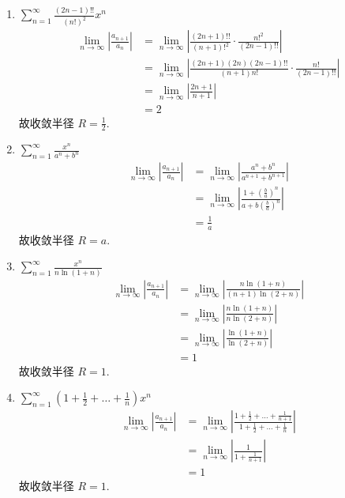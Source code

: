 \begin{solution}
    \begin{enumerate}
        \item \(\sum_{n=1}^{\infty} \frac{(2n-1)!!}{(n!)^2} x^n\)
            \begin{align*}
                \lim_{n \to \infty} \left| \frac{a_{n+1}}{a_n}
                \right| &= \lim_{n \to \infty} \left|
                \frac{(2n+1)!!}{(n+1)!^2} \cdot
                \frac{n!^2}{(2n-1)!!} \right| \\
                &= \lim_{n \to \infty} \left|
                \frac{(2n+1)(2n)(2n-1)!!}{(n+1)n!} \cdot
                \frac{n!}{(2n-1)!!} \right| \\
                &= \lim_{n \to \infty} \left|
                \frac{2n+1}{n+1} \right| \\
                &= 2
            \end{align*}
            故收敛半径 \(R = \frac{1}{2}\).
        \item \(\sum_{n=1}^{\infty} \frac{x^{n}}{a^{n} + b^{n}}\)
            \begin{align*}
                \lim_{n \to \infty} \left| \frac{a_{n+1}}{a_n}
                \right| &= \lim_{n \to \infty} \left| \frac{a^n +
                b^n}{a^{n+1} + b^{n+1}} \right| \\
                &= \lim_{n \to \infty} \left| \frac{1 +
                \left(\frac{b}{a}\right)^n}{a + b
                \left(\frac{b}{a}\right)^n} \right| \\
                &= \frac{1}{a}
            \end{align*}
            故收敛半径 \(R = a\).
        \item \(\sum_{n=1}^{\infty} \frac{x^n}{n \ln(1+n)}\)
            \begin{align*}
                \lim_{n \to \infty} \left| \frac{a_{n+1}}{a_n}
                \right| &= \lim_{n \to \infty} \left| \frac{n
                \ln(1+n)}{(n+1) \ln(2+n)} \right| \\
                &= \lim_{n \to \infty} \left| \frac{n \ln(1+n)}{n
                \ln(2+n)} \right| \\
                &= \lim_{n \to \infty} \left|
                \frac{\ln(1+n)}{\ln(2+n)} \right| \\
                &= 1
            \end{align*}
            故收敛半径 \(R = 1\).
        \item \(\sum_{n=1}^{\infty} \left(1 + \frac{1}{2} + \dots +
            \frac{1}{n}\right) x^n\)
            \begin{align*}
                \lim_{n \to \infty} \left| \frac{a_{n+1}}{a_n}
                \right| &= \lim_{n \to \infty} \left| \frac{1 +
                \frac{1}{2} + \dots + \frac{1}{n+1}}{1 + \frac{1}{2}
                + \dots + \frac{1}{n}} \right| \\
                &= \lim_{n \to \infty} \left| \frac{1}{1 +
                \frac{1}{n+1}} \right| \\
                &= 1
            \end{align*}
            故收敛半径 \(R = 1\).
    \end{enumerate}
\end{solution}
